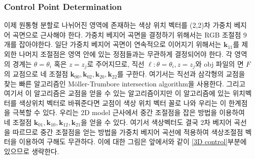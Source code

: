\documentclass{gshs_thesis}
\theoremstyle{theorem}
\theoremstyle{lemma}
\theoremstyle{definition}
\begin{document}
\subsubsection{Control Point Determination}
이제 원통형 분할로 나뉘어진 영역에 존재하는 색상 위치 벡터를 (2,2)차 가중치 베지어 곡면으로 근사해야 한다. 가중치 베지어 곡면을 결정하기 위해서는 RGB 조절점 9개를 잡아야한다. 일단 가중치 베지어 곡면이 연속적으로 이어지기 위해서는 $\mathbf{k}_{11}$를 제외한 나머지 조절점은 영역 안에 있는 정점들과는 무관하게 결정되어야 한다. 각 영역의 경계는 $\theta=\theta_i$ 혹은 $z=z_j$로 주어지므로, 직선 $\ell \colon \theta=\theta_i, z=z_j$와 obj 파일의 면 $F$의 교점으로 네 조절점 $\mathbf{k}_{00}, \mathbf{k}_{02}, \mathbf{k}_{20}, \mathbf{k}_{22}$를 구한다. 여기서는 직선과 삼각형의 교점을 찾는 빠른 알고리즘인 Möller-Trumbore intersection algorithm을 사용한다. 그리고 여기서 이 알고리즘은 교점을 얻을 수 있는 알고리즘이지만 이 알고리즘에 있는 위치벡터를 색상위치 벡터로 바꿔준다면 교점이 색상 위치 벡터 꼴로 나와 우리는 이 한계점을 극복할 수 있다.\cite{raytriangle} 우리는 2D model 근사에서 중간 조절점을 잡은 방법을 이용하여 네 조절점 $\mathbf{k}_{01}, \mathbf{k}_{10}, \mathbf{k}_{12}, \mathbf{k}_{21}$을 얻을 수 있다. 여기서 색상벡터도 결국 2차 베지어 곡선을 따르므로 중간 조절점을 얻는 방법을 가중치 베지어 곡선에 적용하여 색상조절점 벡터을 이용하여 구해도 무관하다. 이에 대한 그림은 앞에서와 같이 \cref{3D control}부분에 있으므로 생략한다.
\end{document}
